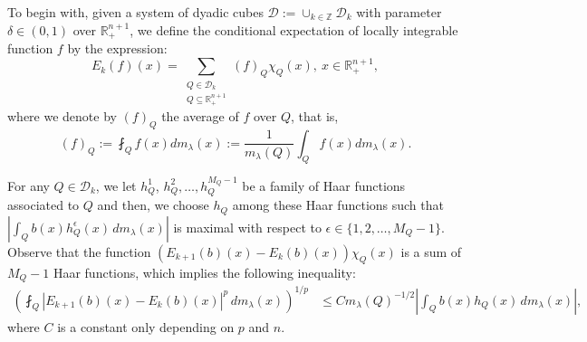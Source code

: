 \documentclass[12pt]{amsart}
\begin{document}
To begin with,
given a
system of dyadic cubes $\mathcal{D}
    := \cup_{k\in\mathbb{Z}}\mathcal{D}_{k}$ with parameter $\delta\in(0,1)$ over $\mathbb{R}_+^{n+1}$, we define the conditional expectation of locally integrable function $f$ by the expression: $$E_{k}(f)(x)=\sum_{\substack{Q\in \mathcal{D}_{k}\\Q\subseteq \mathbb{R}_+^{n+1}}}(f)_{Q}\chi_{Q}(x),\ x\in \mathbb{R}_+^{n+1},$$
where we denote by $(f)_{Q}$ the average of $f$ over $Q$, that is, $$(f)_{Q}:=\fint_{Q}f(x)dm_\lambda(x):=\frac{1}{m_\lambda(Q)}\int_{Q}f(x)dm_\lambda(x).$$

For any $Q\in \mathcal{D}_{k}$, we let $h_{Q}^{1}$, $h_{Q}^{2},\ldots, h_{Q}^{M_Q-1}$ be a family of Haar functions associated to $Q$ and then, we choose $h_{Q}$ among these Haar functions such that $\left|\int_{Q}b(x)h_{Q}^{\epsilon}(x)\,dm_\lambda(x)\right|$ is maximal with respect to $\epsilon\in\{1,2,\ldots,M_Q-1\}$. Observe that the function $(E_{k+1}(b)(x)-E_{k}(b)(x))\chi_Q(x)$ is a sum of $M_Q-1$ Haar functions, which implies the following inequality:
\begin{align}\label{tttt1}
\left(\fint_{Q}|E_{k+1}(b)(x)-E_{k}(b)(x)|^{p}\,dm_\lambda(x)\right)^{1/p}
&\leq C  m_\lambda(Q)^{-1/2}\left|\int_{Q}b(x)h_{Q}(x)\,dm_\lambda(x)\right|,
\end{align}
where $C$ is a constant only depending on $p$ and $n$.
\end{document}
